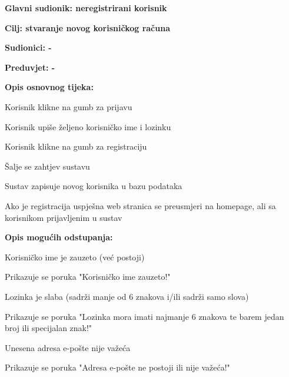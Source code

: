 					\noindent {}
					\begin{packed_item}
						\item \textbf{Glavni sudionik: neregistrirani korisnik}
						\item  \textbf{Cilj: stvaranje novog korisničkog računa}
						\item  \textbf{Sudionici: -}
						\item  \textbf{Preduvjet: -}
						
						\item  \textbf{Opis osnovnog tijeka:}
						\item[] \begin{packed_enum}
							\item Korisnik klikne na gumb za prijavu
							\item Korisnik upiše  željeno korisničko ime i lozinku
							\item Korisnik klikne na gumb za registraciju
							\item Šalje se zahtjev sustavu
							\item Sustav zapisuje novog korisnika u bazu podataka
							\item Ako je registracija uspješna web stranica se preusmjeri na homepage, ali sa korisnikom prijavljenim u sustav
						\end{packed_enum}
						
						\item  \textbf{Opis mogućih odstupanja:}
						\item[] \begin{packed_item}							
							\item[5.a] Korisničko ime je zauzeto (već postoji)
							\begin{packed_enum}
								\item Prikazuje se poruka "Korisničko ime zauzeto!"
							\end{packed_enum}
							\item[5.b] Lozinka je slaba (sadrži manje od 6 znakova i/ili sadrži samo slova)
							\begin{packed_enum}
								\item Prikazuje se poruka "Lozinka mora imati najmanje 6 znakova te barem jedan broj ili specijalan znak!"
							\end{packed_enum}
							\item[5.c] Unesena adresa e-pošte nije važeća
							\begin{packed_enum}
								\item Prikazuje se poruka "Adresa e-pošte ne postoji ili nije važeća!"
							\end{packed_enum}
						\end{packed_item}
					\end{packed_item}


